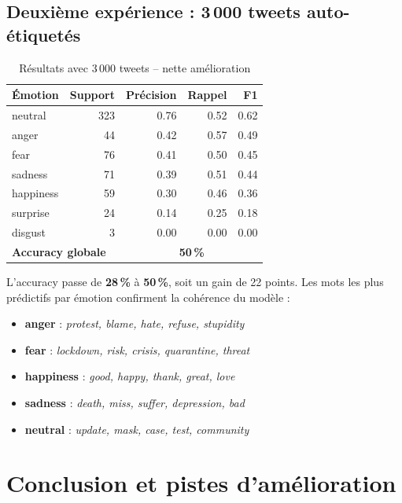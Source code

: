 \documentclass[12pt, a4paper]{article}
\begin{document}
\subsection{Deuxième expérience : 3\,000 tweets auto-étiquetés}

\begin{table}[h!]
\centering
\begin{tabular}{lrrrr}
\toprule
\textbf{Émotion} & \textbf{Support} & \textbf{Précision} & \textbf{Rappel} & \textbf{F1} \\
\midrule
neutral   & 323 & 0.76 & 0.52 & 0.62 \\
anger     &  44 & 0.42 & 0.57 & 0.49 \\
fear      &  76 & 0.41 & 0.50 & 0.45 \\
sadness   &  71 & 0.39 & 0.51 & 0.44 \\
happiness &  59 & 0.30 & 0.46 & 0.36 \\
surprise  &  24 & 0.14 & 0.25 & 0.18 \\
disgust   &   3 & 0.00 & 0.00 & 0.00 \\
\midrule
\multicolumn{2}{l}{\textbf{Accuracy globale}} & \multicolumn{3}{c}{\textbf{50\,\%}} \\
\bottomrule
\end{tabular}
\caption{Résultats avec 3\,000 tweets -- nette amélioration}
\end{table}

L'accuracy passe de \textbf{28\,\%} à \textbf{50\,\%}, soit un gain de 22 points.
Les mots les plus prédictifs par émotion confirment la cohérence du modèle :

\begin{itemize}
    \item \textbf{anger} : \textit{protest, blame, hate, refuse, stupidity}
    \item \textbf{fear} : \textit{lockdown, risk, crisis, quarantine, threat}
    \item \textbf{happiness} : \textit{good, happy, thank, great, love}
    \item \textbf{sadness} : \textit{death, miss, suffer, depression, bad}
    \item \textbf{neutral} : \textit{update, mask, case, test, community}
\end{itemize}

\section{Conclusion et pistes d'amélioration}
\end{document}
